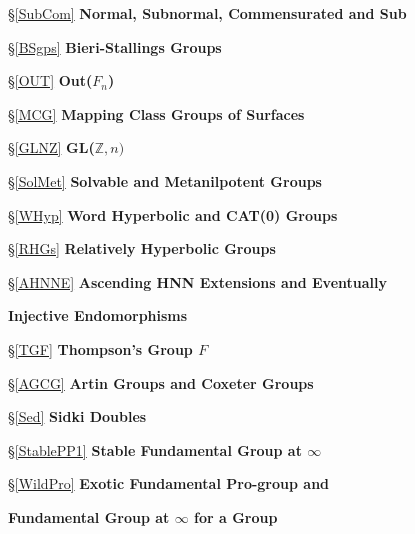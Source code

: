 \documentclass[12pt]{article}
\begin{document}
\noindent\hspace{1.7in}{\bf Manifolds (Historical)} 

\noindent\hspace{1.2in} \S \ref{SubCom} {\bf Normal, Subnormal, Commensurated and Sub} 

\noindent\hspace{1.7in}{\bf Commensurated Subgroups}

\noindent\hspace{1.2in} \S \ref{BSgps} {\bf Bieri-Stallings Groups}

\noindent\hspace{1.2in} \S \ref{OUT} {\bf Out($F_n$)}

\noindent\hspace{1.2in} \S \ref{MCG} {\bf Mapping Class Groups of Surfaces}

\noindent\hspace{1.2in} \S \ref{GLNZ} {\bf GL($\mathbb Z,n)$}

\noindent\hspace{1.2in} \S \ref{SolMet} {\bf Solvable and Metanilpotent Groups}

\noindent\hspace{1.2in} \S \ref{WHyp} {\bf Word Hyperbolic and CAT(0) Groups}

\noindent\hspace{1.2in} \S \ref{RHGs} {\bf Relatively Hyperbolic Groups}

\noindent\hspace{1.2in} \S \ref{AHNNE} {\bf Ascending HNN Extensions and Eventually} 

\noindent\hspace{1.7in} {\bf Injective Endomorphisms}

\noindent\hspace{1.2in} \S \ref{TGF} {\bf Thompson's Group $F$} 

\noindent\hspace{1.2in} \S \ref{AGCG} {\bf Artin Groups and Coxeter Groups}

\noindent\hspace{1.2in} \S \ref{Sed} {\bf Sidki Doubles} 

\noindent\hspace{1.2in} \S \ref{StablePP1} {\bf Stable Fundamental Group at $\infty$}

\noindent\hspace{1.2in} \S \ref{WildPro} {\bf Exotic Fundamental Pro-group and} 

\noindent\hspace{1.7in} {\bf Fundamental Group at $\infty$ for a Group}
\end{document}
